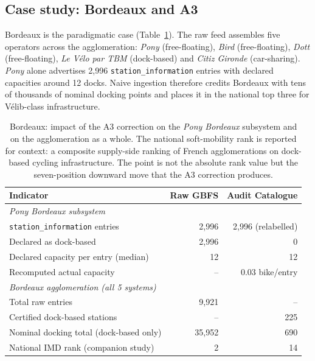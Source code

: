 \documentclass[11pt,a4paper]{article}
\begin{document}
\subsection{Case study: Bordeaux and A3}
Bordeaux is the paradigmatic case (Table~\ref{tab:bordeaux}). The raw
feed assembles five operators across the agglomeration: \emph{Pony}
(free-floating), \emph{Bird} (free-floating), \emph{Dott}
(free-floating), \emph{Le V\'elo par TBM} (dock-based) and \emph{Citiz
Gironde} (car-sharing). \emph{Pony} alone advertises 2{,}996
\texttt{station\_information} entries with declared capacities around
12 docks. Naive ingestion therefore credits Bordeaux with tens of
thousands of nominal docking points and places it in the national top
three for V\'elib-class infrastructure.

\begin{table}[ht]
\centering
\caption{Bordeaux: impact of the A3 correction on the
\emph{Pony Bordeaux} subsystem and on the agglomeration as a whole.
The national soft-mobility rank is reported for context: a composite
supply-side ranking of French agglomerations on dock-based cycling
infrastructure. The point is not the absolute rank value but the
seven-position downward move that the A3 correction produces.}
\label{tab:bordeaux}
\small
\begin{tabular}{@{}lrr@{}}
\toprule
\textbf{Indicator} & \textbf{Raw GBFS} & \textbf{Audit Catalogue}\\
\midrule
\textit{Pony Bordeaux subsystem} & & \\
\quad \texttt{station\_information} entries & 2{,}996 & 2{,}996 (relabelled) \\
\quad Declared as dock-based                 & 2{,}996 & 0 \\
\quad Declared capacity per entry (median)   & 12      & 12 \\
\quad Recomputed actual capacity             & --      & 0.03 bike/entry \\
\midrule
\textit{Bordeaux agglomeration (all 5 systems)} & & \\
\quad Total raw entries                      & 9{,}921 & -- \\
\quad Certified dock-based stations           & --      & 225 \\
\quad Nominal docking total (dock-based only) & 35{,}952 & 690 \\
\quad National IMD rank (companion study)     & 2       & 14 \\
\bottomrule
\end{tabular}
\end{table}
\end{document}
